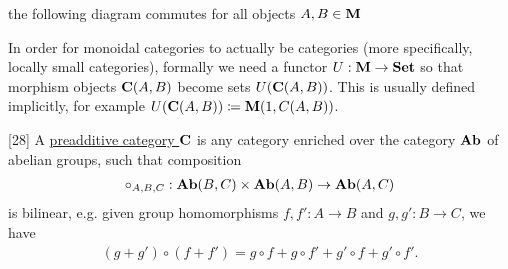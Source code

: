 \begin{definition}
\begin{defenum}
    \item the following diagram commutes for all objects $A, B \in \operatorname{\mathbf{M}}$

    \begin{Center}
    \end{Center}
  \end{defenum}

  In order for monoidal categories to actually be categories (more specifically, locally small categories), formally we need a functor $U: \operatorname{\mathbf{M}} \to \operatorname{\mathbf{Set}}$ so that morphism objects $\operatorname{\mathbf{C}}(A, B)$ become sets $U(\operatorname{\mathbf{C}}(A, B))$. This is usually defined implicitly, for example $U(\operatorname{\mathbf{C}}(A, B)) \coloneqq \operatorname{\mathbf{M}}(1, C(A, B))$.
\end{definition}

\begin{definition}\label{def:preadditive_category}\cite{MacLane1994}[28]
  A \ul{preadditive category $\operatorname{\mathbf{C}}$} is any category enriched over the category $\operatorname{\mathbf{Ab}}$ of abelian groups, such that composition
  \begin{align*}
    \circ_{A,B,C}: \operatorname{\mathbf{Ab}}(B, C) \times \operatorname{\mathbf{Ab}}(A, B) \to \operatorname{\mathbf{Ab}}(A, C)
  \end{align*}
  is bilinear, e.g. given group homomorphisms $f, f': A \to B$ and $g, g': B \to C$, we have
  \begin{align*}
    (g + g') \circ (f + f') = g \circ f + g \circ f' + g' \circ f + g' \circ f'.
  \end{align*}
\end{definition}

